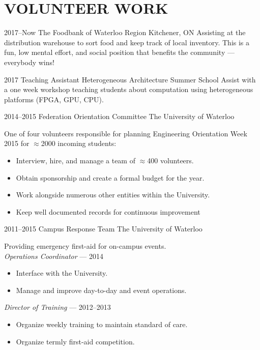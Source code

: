 \documentclass[a4paper,nocolors]{cv-friggeri-ben}
\begin{document}
\section{VOLUNTEER WORK}
\begin{entrylist}

\entry
    {2017--Now}
    {The Foodbank of Waterloo Region}
    {Kitchener, ON}
    {Assisting at the distribution warehouse to sort food and keep track of local inventory. This is a fun, low mental effort, and social position that benefits the community --- everybody wins!}

\entry
    {2017}
    {Teaching Assistant}
    {Heterogeneous Architecture Summer School}
    {Assist with a one week workshop teaching students about computation using heterogeneous platforms (FPGA, GPU, CPU).}

\entry
    {2014--2015}
    {Federation Orientation Committee}
    {The University of Waterloo}
    {One of four volunteers responsible for planning Engineering Orientation Week 2015 for $\approx$2000 incoming students:
    \begin{itemize}
        \item Interview, hire, and manage a team of $\approx$400 volunteers.
        \item Obtain sponsorship and create a formal budget for the year.
        \item Work alongside numerous other entities within the University.
        \item Keep well documented records for continuous improvement
    \end{itemize}}

\entry
    {2011--2015}
    {Campus Response Team}
    {The University of Waterloo}
    {Providing emergency first-aid for on-campus events.\\
    \emph{Operations Coordinator} --- 2014
    \begin{itemize}
        \item Interface with the University.
        \item Manage and improve day-to-day and event operations.
    \end{itemize}
    \emph{Director of Training} --- 2012--2013
    \begin{itemize}
        \item Organize weekly training to maintain standard of care.
        \item Organize termly first-aid competition.
    \end{itemize}}

\end{entrylist}
\end{document}
